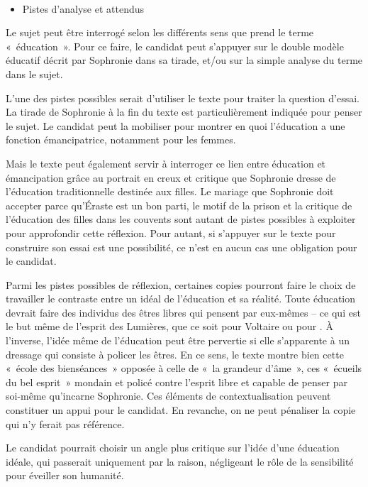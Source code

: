 {\vfill{~}\clearpage
\begin{itemize}[label=\textbullet]
\item Pistes d'analyse et attendus
\end{itemize}

Le sujet peut être interrogé selon les différents sens que prend le terme «~éducation~».
Pour ce faire, le candidat peut s'appuyer sur le double modèle éducatif décrit par
Sophronie dans sa tirade, et/ou sur la simple analyse du terme dans le sujet.

L'une des pistes possibles serait d'utiliser le texte pour traiter la question d'essai. La
tirade de Sophronie à la fin du texte est particulièrement indiquée pour penser le sujet.
Le candidat peut la mobiliser pour montrer en quoi l'éducation a une fonction
émancipatrice, notamment pour les femmes.

Mais le texte peut également servir à interroger ce lien entre éducation et émancipation
grâce au portrait en creux et critique que Sophronie dresse de l'éducation traditionnelle
destinée aux filles. Le mariage que Sophronie doit accepter parce qu'Éraste est un
bon parti, le motif de la prison et la critique de l'éducation des filles dans les couvents
sont autant de pistes possibles à exploiter pour approfondir cette réflexion. Pour
autant, si s'appuyer sur le texte pour construire son essai est une possibilité, ce n'est
en aucun cas une obligation pour le candidat.

Parmi les pistes possibles de réflexion, certaines copies pourront faire le choix de
travailler le contraste entre un idéal de l'éducation et sa réalité. Toute éducation devrait
faire des individus des êtres libres qui pensent par eux-mêmes – ce qui est le but
même de l'esprit des Lumières, que ce soit pour Voltaire ou pour . À l'inverse,
l'idée même de l'éducation peut être pervertie si elle s'apparente à un dressage qui
consiste à policer les êtres. En ce sens, le texte montre bien cette «~école des
bienséances~» opposée à celle de «~la grandeur d'âme~», ces «~écueils du bel esprit~»
mondain et policé contre l'esprit libre et capable de penser par soi-même qu'incarne
Sophronie. Ces éléments de contextualisation peuvent constituer un appui pour le
candidat. En revanche, on ne peut pénaliser la copie qui n'y ferait pas référence.

Le candidat pourrait choisir un angle plus critique sur l'idée d'une éducation idéale, qui
passerait uniquement par la raison, négligeant le rôle de la sensibilité pour éveiller son
humanité.

}

